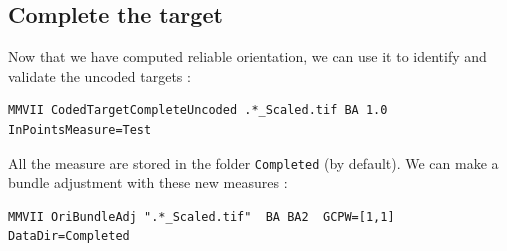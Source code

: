 
\subsection{Complete the target}

Now that we have computed reliable  orientation, we can use it to identify and
validate the uncoded targets :

\begin{lstlisting}
MMVII CodedTargetCompleteUncoded .*_Scaled.tif BA 1.0 InPointsMeasure=Test
\end{lstlisting}

All the measure are stored in the  folder {\tt Completed} (by default). We can make a
bundle adjustment with these new measures :

\begin{lstlisting}
MMVII OriBundleAdj ".*_Scaled.tif"  BA BA2  GCPW=[1,1] DataDir=Completed
\end{lstlisting}





